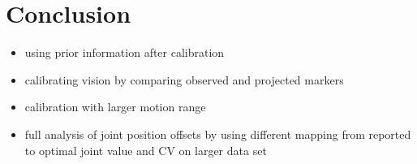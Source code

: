 \chapter{Conclusion}

\begin{itemize}
\item using prior information after calibration
\item calibrating vision by comparing observed and projected markers
\item calibration with larger motion range
\item full analysis of joint position offsets by using different mapping from reported to optimal joint value and CV on larger data set
\end{itemize}